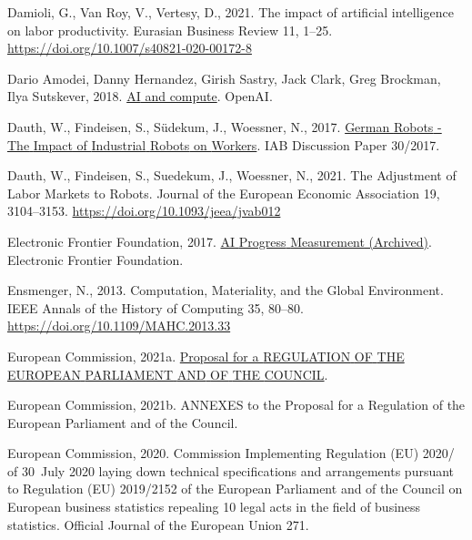 \documentclass[
  12pt,
  a4paperpaper,
]{article}
\newlength{\cslhangindent}
\newenvironment{CSLReferences}[2] %
 {\begin{list}{}{%
  \setlength{\itemindent}{0pt}
  \setlength{\leftmargin}{0pt}
  \setlength{\parsep}{0pt}
  \ifodd #1
   \setlength{\leftmargin}{\cslhangindent}
   \setlength{\itemindent}{-1\cslhangindent}
  \fi
  \setlength{\itemsep}{#2\baselineskip}}}
 {\end{list}}
\begin{document}
\begin{CSLReferences}{1}{0}
Damioli, G., Van Roy, V., Vertesy, D., 2021. The impact of artificial
intelligence on labor productivity. Eurasian Business Review 11, 1--25.
\url{https://doi.org/10.1007/s40821-020-00172-8}

Dario Amodei, Danny Hernandez, Girish Sastry, Jack Clark, Greg Brockman,
Ilya Sutskever, 2018.
\href{https://openai.com/research/ai-and-compute}{{AI} and compute}.
OpenAI.

Dauth, W., Findeisen, S., Südekum, J., Woessner, N., 2017.
\href{https://ssrn.com/abstract=3039031}{German {Robots} - {The}
{Impact} of {Industrial} {Robots} on {Workers}}. IAB Discussion Paper
30/2017.

Dauth, W., Findeisen, S., Suedekum, J., Woessner, N., 2021. The
{Adjustment} of {Labor} {Markets} to {Robots}. Journal of the European
Economic Association 19, 3104--3153.
\url{https://doi.org/10.1093/jeea/jvab012}

Electronic Frontier Foundation, 2017.
\href{https://www.eff.org/de/ai/metrics}{{AI} {Progress} {Measurement}
({Archived})}. Electronic Frontier Foundation.

Ensmenger, N., 2013. Computation, {Materiality}, and the {Global}
{Environment}. IEEE Annals of the History of Computing 35, 80--80.
\url{https://doi.org/10.1109/MAHC.2013.33}

European Commission, 2021a.
\href{https://eur-lex.europa.eu/legal-content/EN/TXT/HTML/?uri=CELEX:52021PC0206}{Proposal
for a {REGULATION} {OF} {THE} {EUROPEAN} {PARLIAMENT} {AND} {OF} {THE}
{COUNCIL}}.

European Commission, 2021b. {ANNEXES} to the {Proposal} for a
{Regulation} of the {European} {Parliament} and of the {Council}.

European Commission, 2020. Commission {Implementing} {Regulation} ({EU})
2020/ of 30~{July} 2020 laying down technical specifications and
arrangements pursuant to {Regulation} ({EU}) 2019/2152 of the {European}
{Parliament} and of the {Council} on {European} business statistics
repealing 10 legal acts in the field of business statistics. Official
Journal of the European Union 271.


\end{CSLReferences}
\end{document}
